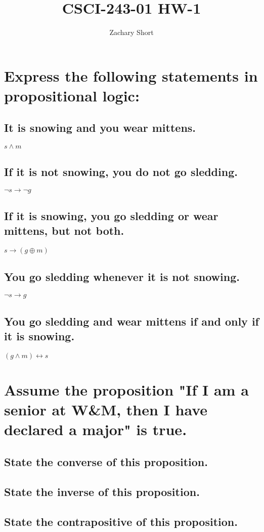 \documentclass{article}
\title{CSCI-243-01 HW-1}
\author{Zachary Short}
\begin{document}
\maketitle

\section{Express the following statements in propositional logic:}
    \subsection{It is snowing and you wear mittens.} $s \land m$
    \subsection{If it is not snowing, you do not go sledding.} $\neg s \rightarrow \neg g$
    \subsection{If it is snowing, you go sledding or wear mittens, but not both.} $s \rightarrow (g \oplus m)$
    \subsection{You go sledding whenever it is not snowing.} $\neg s \rightarrow g$
    \subsection{You go sledding and wear mittens if and only if it is snowing.}$(g \land m) \leftrightarrow s$

\section{Assume the proposition "If I am a senior at W\&M, then I have declared a major" is true.}
    \subsection{State the converse of this proposition.} 
    \subsection{State the inverse of this proposition.} 
    \subsection{State the contrapositive of this proposition.} 
\end{document}
